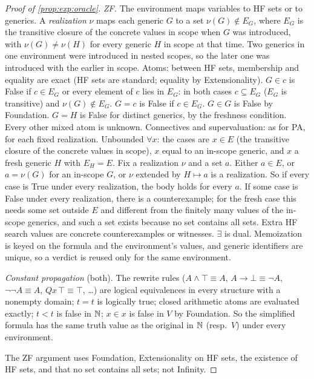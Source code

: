 \begin{proof}[Proof of \cref{prop:exp:oracle}]
\emph{ZF.} The environment maps variables to HF sets or to generics. A \emph{realization} $\nu$ maps each generic $G$ to a set $\nu(G)\notin E_G$, where $E_G$ is the transitive closure of the concrete values in scope when $G$ was introduced, with $\nu(G)\neq\nu(H)$ for every generic $H$ in scope at that time. Two generics in one environment were introduced in nested scopes, so the later one was introduced with the earlier in scope. Atoms: between HF sets, membership and equality are exact (HF sets are standard; equality by Extensionality). $G\in c$ is False if $c\in E_G$ or every element of $c$ lies in $E_G$: in both cases $c\subseteq E_G$ ($E_G$ is transitive) and $\nu(G)\notin E_G$. $G=c$ is False if $c\in E_G$. $G\in G$ is False by Foundation. $G=H$ is False for distinct generics, by the freshness condition. Every other mixed atom is unknown. Connectives and supervaluation: as for PA, for each fixed realization. Unbounded $\forall x$: the cases are $x\in E$ (the transitive closure of the concrete values in scope), $x$ equal to an in-scope generic, and $x$ a fresh generic $H$ with $E_H=E$. Fix a realization $\nu$ and a set $a$. Either $a\in E$, or $a=\nu(G)$ for an in-scope $G$, or $\nu$ extended by $H\mapsto a$ is a realization. So if every case is True under every realization, the body holds for every $a$. If some case is False under every realization, there is a counterexample; for the fresh case this needs some set outside $E$ and different from the finitely many values of the in-scope generics, and such a set exists because no set contains all sets. Extra HF search values are concrete counterexamples or witnesses. $\exists$ is dual. Memoization is keyed on the formula and the environment's values, and generic identifiers are unique, so a verdict is reused only for the same environment.

\emph{Constant propagation} (both). The rewrite rules ($A\wedge\top\equiv A$, $A\to\bot\equiv\neg A$, $\neg\neg A\equiv A$, $Qx\,\top\equiv\top$, \dots) are logical equivalences in every structure with a nonempty domain; $t=t$ is logically true; closed arithmetic atoms are evaluated exactly; $t<t$ is false in $\mathbb{N}$; $x\in x$ is false in $V$ by Foundation. So the simplified formula has the same truth value as the original in $\mathbb{N}$ (resp.\ $V$) under every environment.

The ZF argument uses Foundation, Extensionality on HF sets, the existence of HF sets, and that no set contains all sets; not Infinity.
\end{proof}

